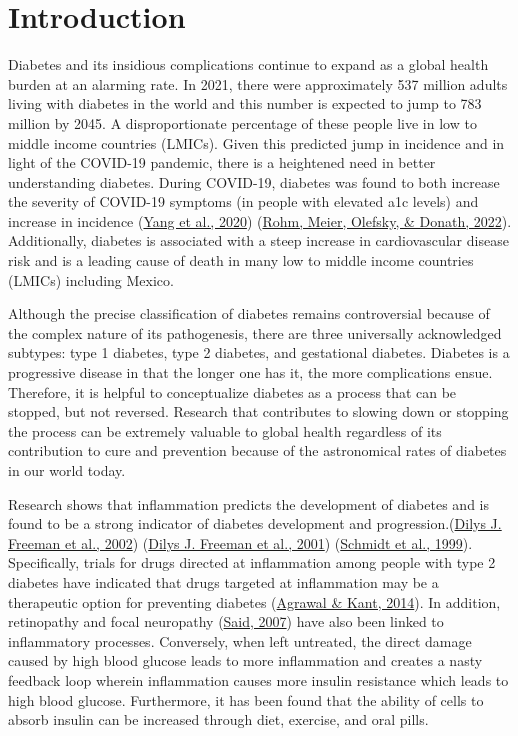 \documentclass[
  man]{apa6}
\begin{document}
\hypertarget{introduction}{%
\section{Introduction}\label{introduction}}

Diabetes and its insidious complications continue to expand as a global health burden at an alarming rate. In 2021, there were approximately 537 million adults living with diabetes in the world and this number is expected to jump to 783 million by 2045. A disproportionate percentage of these people live in low to middle income countries (LMICs). Given this predicted jump in incidence and in light of the COVID-19 pandemic, there is a heightened need in better understanding diabetes. During COVID-19, diabetes was found to both increase the severity of COVID-19 symptoms (in people with elevated a1c levels) and increase in incidence (\protect\hyperlink{ref-yangPrevalenceComorbiditiesIts2020}{Yang et al., 2020}) (\protect\hyperlink{ref-rohmInflammationObesityDiabetes2022}{Rohm, Meier, Olefsky, \& Donath, 2022}). Additionally, diabetes is associated with a steep increase in cardiovascular disease risk and is a leading cause of death in many low to middle income countries (LMICs) including Mexico.

Although the precise classification of diabetes remains controversial because of the complex nature of its pathogenesis, there are three universally acknowledged subtypes: type 1 diabetes, type 2 diabetes, and gestational diabetes. Diabetes is a progressive disease in that the longer one has it, the more complications ensue. Therefore, it is helpful to conceptualize diabetes as a process that can be stopped, but not reversed. Research that contributes to slowing down or stopping the process can be extremely valuable to global health regardless of its contribution to cure and prevention because of the astronomical rates of diabetes in our world today.

Research shows that inflammation predicts the development of diabetes and is found to be a strong indicator of diabetes development and progression.(\protect\hyperlink{ref-freemanCreactiveProteinIndependent2002}{Dilys J. Freeman et al., 2002}) (\protect\hyperlink{ref-10.1161ux2f01.cir.103.3.357}{Dilys J. Freeman et al., 2001}) (\protect\hyperlink{ref-schmidtMarkersInflammationPrediction1999}{Schmidt et al., 1999}). Specifically, trials for drugs directed at inflammation among people with type 2 diabetes have indicated that drugs targeted at inflammation may be a therapeutic option for preventing diabetes (\protect\hyperlink{ref-10.4239ux2fwjd.v5.i5.697}{Agrawal \& Kant, 2014}). In addition, retinopathy and focal neuropathy (\protect\hyperlink{ref-saidDiabeticNeuropathyReview2007}{Said, 2007}) have also been linked to inflammatory processes. Conversely, when left untreated, the direct damage caused by high blood glucose leads to more inflammation and creates a nasty feedback loop wherein inflammation causes more insulin resistance which leads to high blood glucose. Furthermore, it has been found that the ability of cells to absorb insulin can be increased through diet, exercise, and oral pills.
\end{document}
